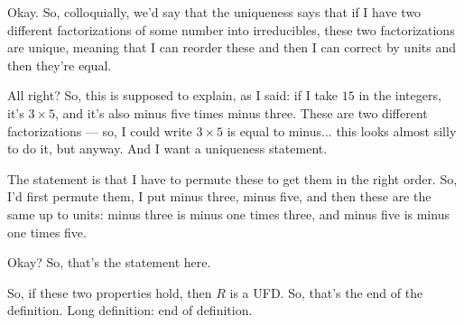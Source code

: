 \begin{speech}[00:15:05 - 00:16:20]
Okay. So, colloquially, we'd say that the uniqueness says that if I have two different factorizations of some number into irreducibles, these two factorizations are unique, meaning that I can reorder these and then I can correct by units and then they're equal.

All right? So, this is supposed to explain, as I said: if I take $15$ in the integers,  it's $3 \times 5$, and it's also minus five  times minus three. These are two different factorizations --- so, I could write $3 \times 5$  is equal to minus... this looks almost silly to do it, but anyway. And I want a uniqueness statement.

The statement is that I have to permute these to get them in the right order. So, I'd first permute them,  I put minus three, minus five, and then these are the same up to units:  minus three is minus one times three, and minus five is minus one times five.

Okay? So, that's the statement here.

So, if these two properties hold, then $R$ is a UFD. So, that's the end of the definition. Long definition:  end of definition.
\end{speech}

\begin{content}
\end{content}

